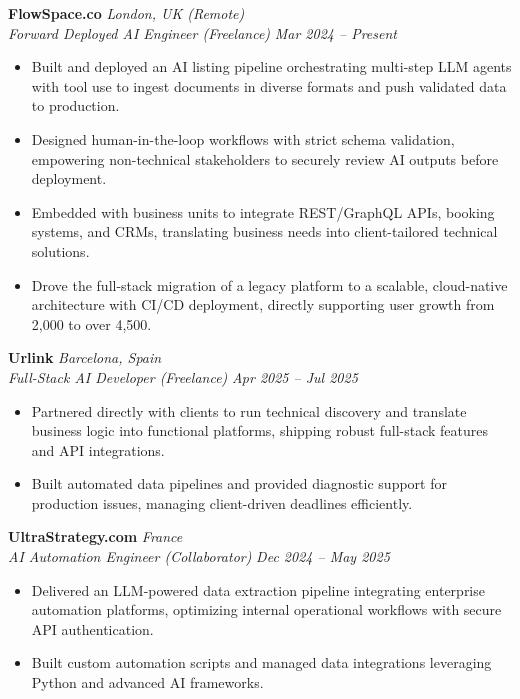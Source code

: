 \documentclass[11pt,a4paper]{article}
\begin{document}
\noindent\textbf{FlowSpace.co} \hfill \textit{London, UK (Remote)} \\
\textit{Forward Deployed AI Engineer (Freelance)} \hfill \textit{Mar 2024 -- Present}
\begin{itemize}[leftmargin=*]
\item Built and deployed an AI listing pipeline orchestrating multi-step LLM agents with tool use to ingest documents in diverse formats and push validated data to production.
\item Designed human-in-the-loop workflows with strict schema validation, empowering non-technical stakeholders to securely review AI outputs before deployment.
\item Embedded with business units to integrate REST/GraphQL APIs, booking systems, and CRMs, translating business needs into client-tailored technical solutions.
\item Drove the full-stack migration of a legacy platform to a scalable, cloud-native architecture with CI/CD deployment, directly supporting user growth from 2,000 to over 4,500.
\end{itemize}

\vspace{0.5em}
\noindent\textbf{Urlink} \hfill \textit{Barcelona, Spain} \\
\textit{Full-Stack AI Developer (Freelance)} \hfill \textit{Apr 2025 -- Jul 2025}
\begin{itemize}[leftmargin=*]
\item Partnered directly with clients to run technical discovery and translate business logic into functional platforms, shipping robust full-stack features and API integrations.
\item Built automated data pipelines and provided diagnostic support for production issues, managing client-driven deadlines efficiently.
\end{itemize}

\vspace{0.5em}
\noindent\textbf{UltraStrategy.com} \hfill \textit{France} \\
\textit{AI Automation Engineer (Collaborator)} \hfill \textit{Dec 2024 -- May 2025}
\begin{itemize}[leftmargin=*]
\item Delivered an LLM-powered data extraction pipeline integrating enterprise automation platforms, optimizing internal operational workflows with secure API authentication.
\item Built custom automation scripts and managed data integrations leveraging Python and advanced AI frameworks.
\end{itemize}
\end{document}
